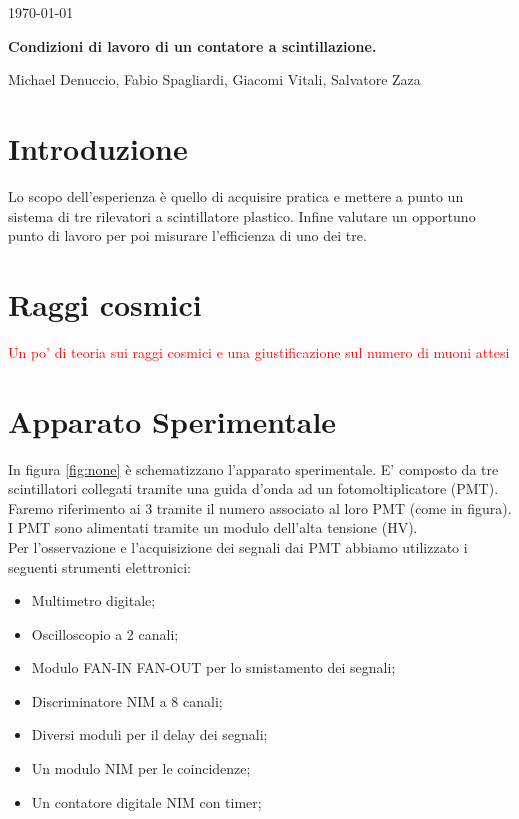 \documentclass[a4paper,10pt]{article}
\newcommand{\note}[1]{\textcolor{red}{#1}}
\begin{document}
\begin{flushright}             
\today
\end{flushright} 

\begin{center}
\Large{\bf Condizioni di lavoro di un contatore a scintillazione. }

\vspace*{1cm}                                 
\large{Michael Denuccio, Fabio Spagliardi, Giacomi Vitali, Salvatore Zaza }\\ 
\vspace*{0.5cm}       
\vspace*{1.cm}
\end{center}



\section{Introduzione}
\label{sec:intro} 
Lo scopo dell'esperienza è quello di acquisire pratica e mettere a punto un sistema di tre rilevatori a scintillatore plastico. Infine valutare un opportuno punto di lavoro per poi misurare l'efficienza di uno dei tre.

\section{Raggi cosmici}
\note{Un po' di teoria sui raggi cosmici e una giustificazione sul numero di muoni attesi}

\section{Apparato Sperimentale}
In figura \ref{fig:none} è schematizzano l'apparato sperimentale. E' composto da tre scintillatori collegati tramite una guida d'onda ad un fotomoltiplicatore (PMT). Faremo riferimento ai 3 tramite il numero associato al loro PMT (come in figura).
\\I PMT sono alimentati tramite un modulo dell'alta tensione (HV). 
\\Per l'osservazione e l'acquisizione dei segnali dai PMT abbiamo utilizzato i seguenti strumenti elettronici:
\begin{itemize}
\item Multimetro digitale;
\item Oscilloscopio a 2 canali;
\item Modulo FAN-IN FAN-OUT per lo smistamento dei segnali;
\item Discriminatore NIM a 8 canali;
\item Diversi moduli per il delay dei segnali;
\item Un modulo NIM per le coincidenze;
\item Un contatore digitale NIM con timer;
\end{itemize}
\end{document}

